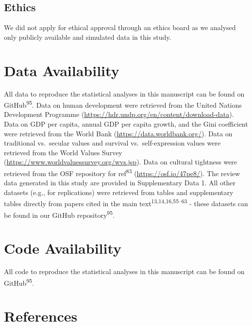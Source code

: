 \documentclass[
  man,floatsintext]{apa6}
\begin{document}
\hypertarget{ethics}{%
\subsection{Ethics}\label{ethics}}

We did not apply for ethical approval through an ethics board as we analysed only publicly available and simulated data in this study.

\newpage
\nolinenumbers

\hypertarget{data-availability}{%
\section{Data Availability}\label{data-availability}}

All data to reproduce the statistical analyses in this manuscript can be found on GitHub\textsuperscript{95}. Data on human development were retrieved from the United Nations Development Programme (\url{https://hdr.undp.org/en/content/download-data}). Data on GDP per capita, annual GDP per capita growth, and the Gini coefficient were retrieved from the World Bank (\url{https://data.worldbank.org/}). Data on traditional vs.~secular values and survival vs.~self-expression values were retrieved from the World Values Survey (\url{https://www.worldvaluessurvey.org/wvs.jsp}). Data on cultural tightness were retrieved from the OSF repository for ref\textsuperscript{83} (\url{https://osf.io/47pe8/}). The review data generated in this study are provided in Supplementary Data 1. All other datasets (e.g., for replications) were retrieved from tables and supplementary tables directly from papers cited in the main text\textsuperscript{13,14,16,55--63} - these datasets can be found in our GitHub repository\textsuperscript{95}.

\hypertarget{code-availability}{%
\section{Code Availability}\label{code-availability}}

All code to reproduce the statistical analyses in this manuscript can be found on GitHub\textsuperscript{95}.

\newpage

\hypertarget{references}{%
\section{References}\label{references}}
\end{document}

